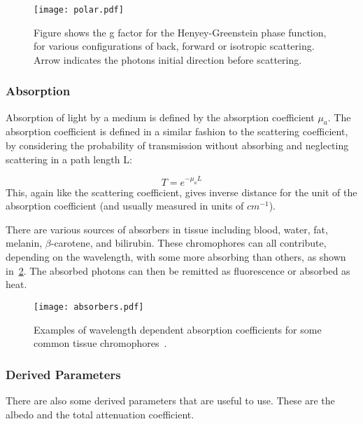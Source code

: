 \begin{figure}
	\centering
	\texttt{[image: polar.pdf]}
	\caption{Figure shows the g factor for the Henyey-Greenstein phase function, for various configurations of back, forward or isotropic scattering. Arrow indicates the photons initial direction before scattering.}
	\label{fig:henyey}
\end{figure}

\subsubsection*{Absorption}\label{sec:absor}

Absorption of light by a medium is defined by the absorption coefficient $\mu_a$. The absorption coefficient is defined in a similar fashion to the scattering coefficient, by considering the probability of transmission without absorbing and neglecting scattering in a path length L:

\begin{equation}
	T=e^{-\mu_aL}
\end{equation}
This, again like the scattering coefficient, gives inverse distance for the unit of the absorption coefficient (and usually measured in units of $cm^{-1}$).

There are various sources of absorbers in tissue including blood, water, fat, melanin, $\beta$-carotene, and bilirubin. These chromophores can all contribute, depending on the wavelength, with some more absorbing than others, as shown in~\cref{fig:absorb}.
The absorbed photons can then be remitted as fluorescence or absorbed as heat. 

\begin{figure}
	\centering
	\texttt{[image: absorbers.pdf]}
	\caption{Examples of wavelength dependent absorption coefficients for some common tissue chromophores~\cite{dixon2005photochemcad,photoprahl2017,segelstein1981complex,pope1997absorption,jacques2013optical,van2004determination,saidi1992transcutaneous,iglesias2015biophysically,bashkatov2011optical,sarna2006physical}.}
	\label{fig:absorb}
\end{figure}


\subsubsection*{Derived Parameters}

There are also some derived parameters that are useful to use.
These are the albedo and the total attenuation coefficient.

